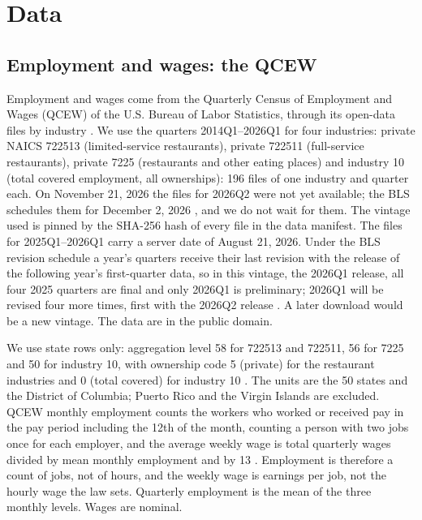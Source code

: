 \section{Data}
\label{sec:data}

\subsection{Employment and wages: the QCEW}

Employment and wages come from the Quarterly Census of Employment and Wages (QCEW) of the U.S.
Bureau of Labor Statistics, through its open-data files by industry
\citep{blsqcewopendata}. We use the quarters 2014Q1--2026Q1 for four industries: private NAICS
722513 (limited-service restaurants), private 722511 (full-service restaurants), private 7225
(restaurants and other eating places) and industry 10 (total covered employment, all ownerships):
196 files of one industry and quarter each. On November 21, 2026 the files for 2026Q2 were not yet
available; the BLS schedules them for December 2, 2026 \citep{bls2026cewq1}, and we do not wait
for them. The vintage used is pinned by the SHA-256 hash of every file in the data manifest. The
files for 2025Q1--2026Q1 carry a server date of August 21, 2026. Under the BLS revision schedule
a year's quarters receive their last revision with the release of the following year's
first-quarter data, so in this vintage, the 2026Q1 release, all four 2025 quarters are final and
only 2026Q1 is preliminary; 2026Q1 will be revised four more times, first with the 2026Q2 release
\citep{blsqcewrevisions,bls2026cewq1}. A later download would be a new vintage. The data are in
the public domain.

We use state rows only: aggregation level 58 for 722513 and 722511, 56 for 7225 and 50 for
industry 10, with ownership code 5 (private) for the restaurant industries and 0 (total covered)
for industry 10 \citep{blsqcewagglvl,blsqcewowncodes}. The units are the 50 states and the
District of Columbia; Puerto Rico and the Virgin Islands are excluded. QCEW monthly employment
counts the workers who worked or received pay in the pay period including the 12th of the month,
counting a person with two jobs once for each employer, and the average weekly wage is total
quarterly wages divided by mean monthly employment and by 13
\citep{blsqcewhom,blsqcewtechnote}. Employment is therefore a count of jobs, not of hours, and the
weekly wage is earnings per job, not the hourly wage the law sets. Quarterly employment is the
mean of the three monthly levels. Wages are nominal.

